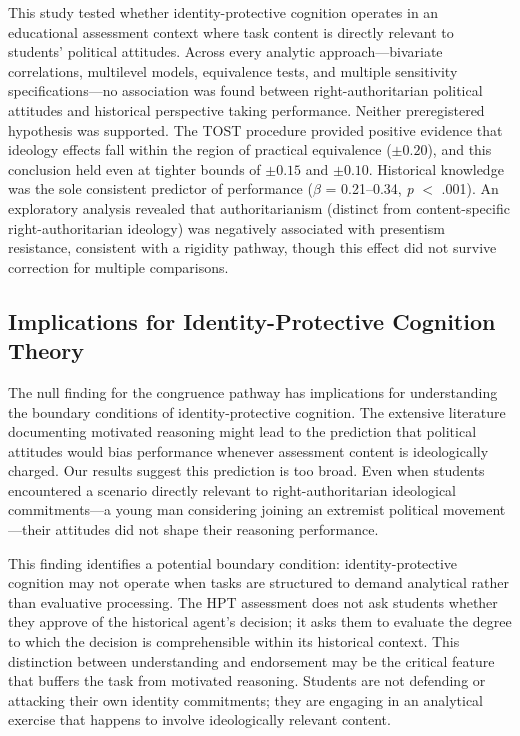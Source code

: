 \documentclass[referee,pdflatex,sn-apa]{sn-jnl}
\begin{document}
This study tested whether identity-protective cognition operates in an educational assessment context where task content is directly relevant to students' political attitudes. Across every analytic approach---bivariate correlations, multilevel models, equivalence tests, and multiple sensitivity specifications---no association was found between right-authoritarian political attitudes and historical perspective taking performance. Neither preregistered hypothesis was supported. The TOST procedure provided positive evidence that ideology effects fall within the region of practical equivalence ($\pm 0.20$), and this conclusion held even at tighter bounds of $\pm 0.15$ and $\pm 0.10$. Historical knowledge was the sole consistent predictor of performance ($\beta$ = 0.21--0.34, \textit{p} $<$ .001). An exploratory analysis revealed that authoritarianism (distinct from content-specific right-authoritarian ideology) was negatively associated with presentism resistance, consistent with a rigidity pathway, though this effect did not survive correction for multiple comparisons.

\subsection{Implications for Identity-Protective Cognition Theory}\label{subsec:ipctheory}

The null finding for the congruence pathway has implications for understanding the boundary conditions of identity-protective cognition. The extensive literature documenting motivated reasoning \citep{Kahan2017,Kunda1990,LodgeTaber2013,Stanovich2013} might lead to the prediction that political attitudes would bias performance whenever assessment content is ideologically charged. Our results suggest this prediction is too broad. Even when students encountered a scenario directly relevant to right-authoritarian ideological commitments---a young man considering joining an extremist political movement---their attitudes did not shape their reasoning performance.

This finding identifies a potential boundary condition: identity-protective cognition may not operate when tasks are structured to demand analytical rather than evaluative processing. The HPT assessment does not ask students whether they approve of the historical agent's decision; it asks them to evaluate the degree to which the decision is comprehensible within its historical context. This distinction between understanding and endorsement \citep{Lee2001} may be the critical feature that buffers the task from motivated reasoning. Students are not defending or attacking their own identity commitments; they are engaging in an analytical exercise that happens to involve ideologically relevant content.
\end{document}
